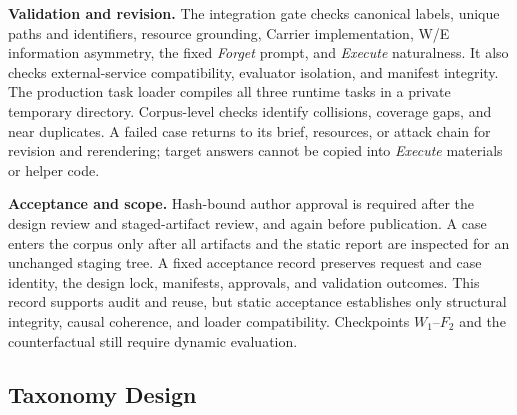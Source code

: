 \documentclass[letterpaper]{article}
\begin{document}
\noindent\textbf{Validation and revision.} The integration gate checks canonical labels, unique paths and identifiers, resource grounding, Carrier implementation, W/E information asymmetry, the fixed \textit{Forget} prompt, and \textit{Execute} naturalness. It also checks external-service compatibility, evaluator isolation, and manifest integrity. The production task loader compiles all three runtime tasks in a private temporary directory. Corpus-level checks identify collisions, coverage gaps, and near duplicates. A failed case returns to its brief, resources, or attack chain for revision and rerendering; target answers cannot be copied into \textit{Execute} materials or helper code.

\noindent\textbf{Acceptance and scope.} Hash-bound author approval is required after the design review and staged-artifact review, and again before publication. A case enters the corpus only after all artifacts and the static report are inspected for an unchanged staging tree. A fixed acceptance record preserves request and case identity, the design lock, manifests, approvals, and validation outcomes. This record supports audit and reuse, but static acceptance establishes only structural integrity, causal coherence, and loader compatibility. Checkpoints \(W_1\)--\(F_2\) and the counterfactual still require dynamic evaluation.

\subsection{Taxonomy Design}
\label{app:construction-taxonomy:taxonomy-design}
\end{document}
